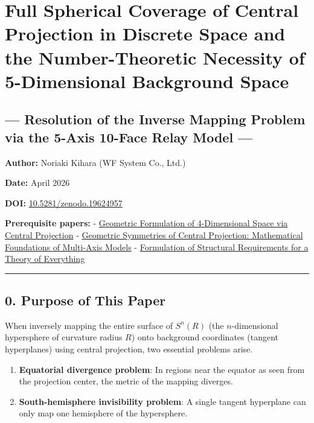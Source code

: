 \documentclass[a4paper,11pt]{article}
\providecommand{\tightlist}{\setlength{\itemsep}{0pt}\setlength{\parskip}{0pt}}
\begin{document}
\section{Full Spherical Coverage of Central Projection in Discrete Space
and the Number-Theoretic Necessity of 5-Dimensional Background
Space}\label{full-spherical-coverage-of-central-projection-in-discrete-space-and-the-number-theoretic-necessity-of-5-dimensional-background-space}

\subsection{--- Resolution of the Inverse Mapping Problem via the 5-Axis
10-Face Relay Model
---}\label{resolution-of-the-inverse-mapping-problem-via-the-5-axis-10-face-relay-model}

\textbf{Author:} Noriaki Kihara (WF System Co., Ltd.)

\textbf{Date:} April 2026

\textbf{DOI:}
\href{https://doi.org/10.5281/zenodo.19624957}{10.5281/zenodo.19624957}

\textbf{Prerequisite papers:} -
\href{https://doi.org/10.5281/zenodo.19427780}{Geometric Formulation of
4-Dimensional Space via Central Projection} -
\href{https://doi.org/10.5281/zenodo.19434932}{Geometric Symmetries of
Central Projection: Mathematical Foundations of Multi-Axis Models} -
\href{https://doi.org/10.5281/zenodo.19601592}{Formulation of Structural
Requirements for a Theory of Everything}

\begin{center}\rule{0.5\linewidth}{0.5pt}\end{center}

\subsection{0. Purpose of This Paper}\label{purpose-of-this-paper}

When inversely mapping the entire surface of \(S^n(R)\) (the
\(n\)-dimensional hypersphere of curvature radius \(R\)) onto background
coordinates (tangent hyperplanes) using central projection, two
essential problems arise.

\begin{enumerate}
\def\labelenumi{\arabic{enumi}.}
\tightlist
\item
  \textbf{Equatorial divergence problem}: In regions near the equator as
  seen from the projection center, the metric of the mapping diverges.
\item
  \textbf{South-hemisphere invisibility problem}: A single tangent
  hyperplane can only map one hemisphere of the hypersphere.
\end{enumerate}
\end{document}
